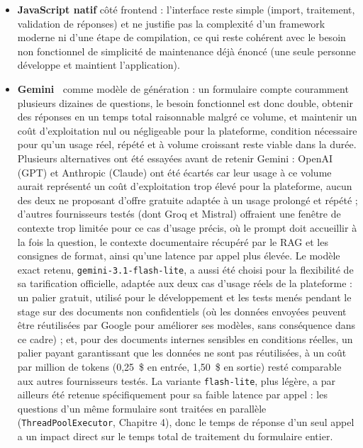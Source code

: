 \documentclass[12pt,a4paper]{report}
\begin{document}
\begin{itemize}
    chaque script Python qui y écrit. Le schéma repose donc sur de
    nombreuses contraintes \texttt{CHECK} directement définies en
    base : un ORM masquerait ce niveau de contrôle ou obligerait à le
    dupliquer côté Python. Le SQL brut permet aussi d'écrire directement
    des requêtes plus complexes (par exemple \texttt{DISTINCT ON} pour
    ne garder que la dernière réponse proposée par question) sans
    contourner les limites d'un
    ORM.
    \item \textbf{JavaScript natif} côté
    frontend : l'interface reste simple (import, traitement, validation
    de réponses) et ne justifie pas la complexité d'un framework moderne
    ni d'une étape de compilation, ce qui reste cohérent avec le besoin non
    fonctionnel de simplicité de maintenance déjà énoncé (une seule
    personne développe et maintient l'application).
    \item \textbf{Gemini~\cite{gemini}} comme modèle de génération : un formulaire
    compte couramment plusieurs dizaines de questions, le besoin fonctionnel est donc
    double, obtenir des réponses en un temps total raisonnable malgré ce volume, et
    maintenir un coût d'exploitation nul ou négligeable pour la plateforme, condition
    nécessaire pour qu'un usage réel, répété et à volume croissant reste viable dans
    la durée. Plusieurs alternatives ont été essayées avant de retenir Gemini : OpenAI
    (GPT) et Anthropic (Claude) ont été écartés car leur usage à ce volume aurait
    représenté un coût d'exploitation trop élevé pour la plateforme, aucun des deux ne
    proposant d'offre gratuite adaptée à un usage prolongé et répété ; d'autres
    fournisseurs testés (dont Groq et Mistral) offraient une fenêtre de contexte trop
    limitée pour ce cas d'usage précis, où le prompt doit accueillir à la fois la
    question, le contexte documentaire récupéré par le RAG et les consignes de format,
    ainsi qu'une latence par appel plus élevée. Le modèle exact retenu,
    \texttt{gemini-3.1-flash-lite}, a aussi été choisi pour la flexibilité de sa
    tarification officielle, adaptée aux deux cas d'usage réels de la plateforme : un
    palier gratuit, utilisé pour le développement et les tests menés pendant le stage
    sur des documents non confidentiels (où les données envoyées peuvent être
    réutilisées par Google pour améliorer ses modèles, sans conséquence dans ce
    cadre) ; et, pour des documents internes sensibles en conditions réelles, un
    palier payant garantissant que les données ne sont pas réutilisées, à un coût par
    million de tokens (0,25~\$ en entrée, 1,50~\$ en sortie) resté comparable aux
    autres fournisseurs testés. La variante \texttt{flash-lite}, plus légère, a par
    ailleurs été retenue spécifiquement pour sa faible latence par appel : les
    questions d'un même formulaire sont traitées en parallèle
    (\texttt{ThreadPoolExecutor}, Chapitre 4), donc le temps de réponse d'un seul
    appel a un impact direct sur le temps total de traitement du formulaire entier.


\end{itemize}
\end{document}

